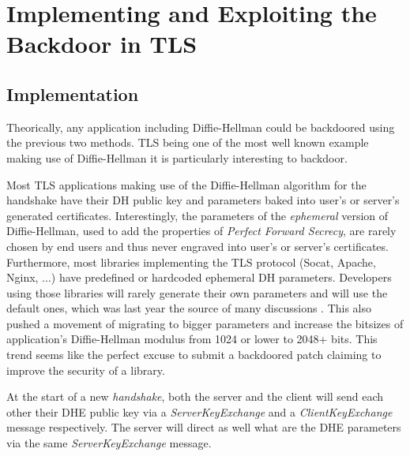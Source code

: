 \documentclass[a4paper,11pt,twocolumn]{article}
\begin{document}

\section{Implementing and Exploiting the Backdoor in TLS}

\subsection{Implementation}

Theorically, any application including Diffie-Hellman could be backdoored using the previous two methods. TLS being one of the most well known example making use of Diffie-Hellman it is particularly interesting to backdoor.

Most TLS applications making use of the Diffie-Hellman algorithm for the handshake have their DH public key and parameters baked into user's or server's generated certificates. Interestingly, the parameters of the \emph{ephemeral} version of Diffie-Hellman, used to add the properties of \emph{Perfect Forward Secrecy}, are rarely chosen by end users and thus never engraved into user's or server's certificates. Furthermore, most libraries implementing the TLS protocol (Socat, Apache, Nginx, ...) have predefined or hardcoded ephemeral DH parameters. Developers using those libraries will rarely generate their own parameters and will use the default ones, which was last year the source of many discussions . This also pushed a movement of migrating to bigger parameters and increase the bitsizes of application's Diffie-Hellman modulus from 1024 or lower to 2048+ bits. This trend seems like the perfect excuse to submit a backdoored patch claiming to improve the security of a library.

At the start of a new \emph{handshake}, both the server and the client will send each other their DHE public key via a \emph{ServerKeyExchange} and a \emph{ClientKeyExchange} message respectively. The server will direct as well what are the DHE parameters via the same \emph{ServerKeyExchange} message.
\end{document}
